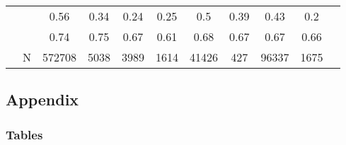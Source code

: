\documentclass[
]{article}
\begin{document}
\begin{landscape}
\begin{table}[ht]
\begin{tabular}{l|>{\raggedright\arraybackslash}p{3.2cm}|ccccccccc}
   & \multicolumn{1}{>{\raggedleft\arraybackslash}p{2.9cm}|}{\makebox[2.9cm][r]{Lives with Child }} & 0.56 & 0.34 & 0.24 & 0.25 & 0.5 & 0.39 & 0.43 & 0.2 \\ 
   & \multicolumn{1}{>{\raggedleft\arraybackslash}p{3.4cm}|}{\makebox[3.4cm][r]{Married/Cohabiting }} & 0.74 & 0.75 & 0.67 & 0.61 & 0.68 & 0.67 & 0.67 & 0.66 \\ 
   & N & 572708 & 5038 & 3989 & 1614 & 41426 & 427 & 96337 & 1675 \\ 
   \hline
\end{tabular}
\endgroup
\end{table}
\end{landscape}

\newpage

\subsection{Appendix}\label{sec-Appendix}

\newpage

\subsubsection{Tables}\label{tables}
\end{document}
